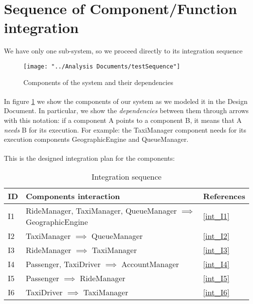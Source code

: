 \section{Sequence of Component/Function integration}\label{sequence}
We have only one sub-system, so we proceed directly to its integration sequence
\begin{figure}[H]
	\centering
	\texttt{[image: "../Analysis Documents/testSequence"]}
	\caption{Components of the system and their dependencies}
	\label{fig:components}
\end{figure}
\paragraph{}In figure \ref{fig:components} we show the components of our system as we modeled it in the Design Document. In particular, we show the \textit{dependencies} between them through arrows with this notation: if a component A points to a component B, it means that A \textit{needs} B for its execution. For example: the TaxiManager component needs for its execution components GeographicEngine and QueueManager.

\paragraph{} This is the designed integration plan for the components:
\begin{table}[H]
\centering
	\begin{tabular}{ l | l | l }
	\textbf{ID} & \textbf{Components interaction} & References \\ \hline
	I1 \label{I1} & RideManager, TaxiManager, QueueManager $\implies$ GeographicEngine & \ref{int_I1} \\ \hline
	I2 \label{I2} & TaxiManager $\implies$ QueueManager & \ref{int_I2} \\ \hline
	I3 \label{I3} & RideManager $\implies$ TaxiManager & \ref{int_I3}\\ \hline
	I4 \label{I4} & Passenger, TaxiDriver $\implies$ AccountManager & \ref{int_I4}\\ \hline
	I5 \label{I5} & Passenger $\implies$ RideManager & \ref{int_I5}\\ \hline
	I6 \label{I6} & TaxiDriver $\implies$ TaxiManager & \ref{int_I6}\\
	\end{tabular}
	\caption{Integration sequence}
\end{table}
%
%
